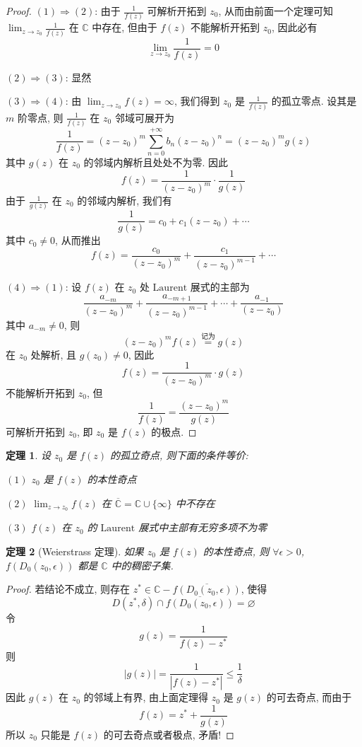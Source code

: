 \documentclass[12pt,a4paper]{article}
\newtheorem{thm}{定理}[section]  %
\begin{document}
\begin{proof}
    $(1) \Rightarrow (2)$: 由于 $\frac{1}{f(z)}$ 可解析开拓到 $z_0$, 从而由前面一个定理可知 $\lim_{z \to z_0} \frac{1}{f(z)}$ 在 $\mathbb{C}$ 中存在, 但由于 $f(z)$ 不能解析开拓到 $z_0$, 因此必有
    \[ \lim_{z \to z_0} \frac{1}{f(z)} = 0\]

    $(2) \Rightarrow (3)$: 显然

    $(3) \Rightarrow (4)$: 由 $\lim_{z \to z_0} f(z) = \infty$, 我们得到 $z_0$ 是 $\frac{1}{f(z)}$ 的孤立零点. 设其是 $m$ 阶零点, 则 $\frac{1}{f(z)}$ 在 $z_0$ 邻域可展开为
    \[\frac{1}{f(z)} = (z-z_0)^m \sum\limits_{n = 0}^{+\infty} b_n (z-z_0)^n = (z-z_0)^m g(z)\]
    其中 $g(z)$ 在 $z_0$ 的邻域内解析且处处不为零. 因此 \[f(z) = \frac{1}{(z-z_0)^m} \cdot \frac{1}{g(z)}\]
    由于 $\frac{1}{g(z)}$ 在 $z_0$ 的邻域内解析, 我们有 \[\frac{1}{g(z)} = c_0 + c_1 (z-z_0) + \cdots\]
    其中 $c_0 \neq 0$, 从而推出 \[f(z) = \frac{c_0}{(z-z_0)^m} + \frac{c_1}{(z-z_0)^{m-1}} + \cdots\] 
    
    $(4) \Rightarrow (1)$: 设 $f(z)$ 在 $z_0$ 处 $\mathrm{Laurent}$ 展式的主部为 
    \[\frac{a_{-m}}{(z-z_0)^m} + \frac{a_{-m+1}}{(z-z_0)^{m-1}} + \cdots + \frac{a_{-1}}{(z-z_0)}\]
    其中 $a_{-m} \neq 0$, 则
    \[(z-z_0)^m f(z) \overset{\text{记为}}{=} g(z)\] 在 $z_0$ 处解析, 且 $g(z_0) \neq 0$, 因此 
    \[ f(z) = \frac{1}{(z-z_0)^m} \cdot g(z) \] 不能解析开拓到 $z_0$, 但
    \[\frac{1}{f(z)} = \frac{(z-z_0)^m}{g(z)}\] 可解析开拓到 $z_0$, 即 $z_0$ 是 $f(z)$ 的极点.
\end{proof}

\begin{thm}
    设 $z_0$ 是 $f(z)$ 的孤立奇点, 则下面的条件等价:

    $(1)$ $z_0$ 是 $f(z)$ 的本性奇点

    $(2)$ $\lim_{z \to z_0} f(z)$ 在 $\overline{\mathbb{C}} = \mathbb{C} \cup \{\infty\}$ 中不存在
    
    $(3)$ $f(z)$ 在 $z_0$ 的 $\mathrm{Laurent}$ 展式中主部有无穷多项不为零
\end{thm}

\begin{thm}[Weierstrass 定理]
    如果 $z_0$ 是 $f(z)$ 的本性奇点, 则 $\forall \epsilon > 0$, $f(D_0(z_0, \epsilon))$ 都是 $\mathbb{C}$ 中的稠密子集.
\end{thm}

\begin{proof}
    若结论不成立, 则存在 $z^* \in \mathbb{C} - \overline{f(D_0(z_0, \epsilon))}$, 使得
    \[ D(z^*, \delta) \cap \overline{f(D_0(z_0, \epsilon))}  = \varnothing \]
    令 \[g(z) = \frac{1}{f(z) - z^*}\] 则 \[|g(z)| = \frac{1}{|f(z) - z^*|} \leq \frac{1}{\delta}\] 
    因此 $g(z)$ 在 $z_0$ 的邻域上有界, 由上面定理得 $z_0$ 是 $g(z)$ 的可去奇点, 而由于
    \[f(z) = z^* + \frac{1}{g(z)}\] 所以 $z_0$ 只能是 $f(z)$ 的可去奇点或者极点, 矛盾!
\end{proof}
\end{document}
